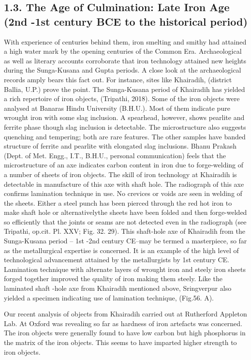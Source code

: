 \subsection*{1.3. The Age of Culmination: Late Iron Age (2nd -1st century BCE to the historical period)}

With experience of centuries behind them, iron smelting and smithy had attained a high water mark by the opening centuries of the Common Era. Archaeological as well as literary accounts corroborate that iron technology attained new heights during the Sunga-Kusana and Gupta periods. A close look at the archaeological records amply bears this fact out. For instance, sites like Khairadih, (district Ballia, U.P.) prove the point. The Sunga-Kusana period of Khairadih has yielded a rich repertoire of iron objects, (Tripathi, 2018). Some of the iron objects were analysed at Banaras Hindu University (B.H.U.). Most of them indicate pure wrought iron with some slag inclusion. A spearhead, however, shows pearlite and ferrite phase though slag inclusion is detectable. The microstructure also suggests quenching and tempering; both are rare features. The other samples have banded structure of ferrite and pearlite with elongated slag inclusions. Bhanu Prakash (Dept. of Met. Engg., I.T., B.H.U., personal communication) feels that the microstructure of an axe indicates carbon content in iron due to forge-welding of a number of sheets of iron objects. The skill of iron technology at Khairadih is detectable in manufacture of this axe with shaft hole. The radiograph of this axe confirms lamination technique in use. No crevices or voids are seen in welding of the sheets. Either a steel punch has been pierced through the red hot iron to make shaft hole or alternativelythe sheets have been folded and then forge-welded so efficiently that the joints or seams are not detected even in the radiograph (see Tripathi, op.cit. Pl. XXV; Fig. 32. 29). This shaft-hole axe of Khairadih from the Sunga-Kusana period – 1st -2nd century CE–may be termed a masterpiece, so far as the metallurgical expertise is concerned. It is an example of the high level of technological advancement attained by the metallurgists by 1st century CE. Lamination technique with alternate layers of wrought iron and steely iron sheets forged together improved the quality of iron making them steely. Like the laminated shaft -hole axe from Khairadih mentioned above, Sringverpur also yielded a specimen indicating use of lamination technique, (Fig.56. A).

Our recent analysis of objects from Khairadih carried out at Rutherford Appleton Lab. At Oxford was revealing so far as hardness of iron artefacts was concerned. The iron objects were generally found to have low carbon but high phosphorus in the matrix of the iron objects. This seems to have imparted higher strength to iron objects.

